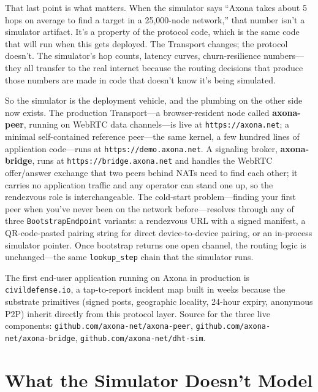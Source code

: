 \documentclass[nobib]{tufte-handout}
\begin{document}
That last point is what matters. When the simulator says ``Axona takes about 5 hops on average to find a target in a 25{,}000-node network,'' that number isn't a simulator artifact. It's a property of the protocol code, which is the same code that will run when this gets deployed. The Transport changes; the protocol doesn't. The simulator's hop counts, latency curves, churn-resilience numbers---they all transfer to the real internet because the routing decisions that produce those numbers are made in code that doesn't know it's being simulated.

So the simulator is the deployment vehicle, and the plumbing on the other side now exists. The production Transport---a browser-resident node called \textbf{axona-peer}, running on WebRTC data channels---is live at \texttt{https://axona.net}; a minimal self-contained reference peer---the same kernel, a few hundred lines of application code---runs at \texttt{https://demo.axona.net}. A signaling broker, \textbf{axona-bridge}, runs at \texttt{https://bridge.axona.net} and handles the WebRTC offer/answer exchange that two peers behind NATs need to find each other; it carries no application traffic and any operator can stand one up, so the rendezvous role is interchangeable. The cold-start problem---finding your first peer when you've never been on the network before---resolves through any of three \texttt{BootstrapEndpoint} variants: a rendezvous URL with a signed manifest, a QR-code-pasted pairing string for direct device-to-device pairing, or an in-process simulator pointer. Once bootstrap returns one open channel, the routing logic is unchanged---the same \texttt{lookup\_step} chain that the simulator runs.

The first end-user application running on Axona in production is \texttt{civildefense.io}, a tap-to-report incident map built in weeks because the substrate primitives (signed posts, geographic locality, 24-hour expiry, anonymous P2P) inherit directly from this protocol layer. Source for the three live components: \texttt{github.com/axona-net/axona-peer}, \texttt{github.com/axona-net/axona-bridge}, \texttt{github.com/axona-net/dht-sim}.

\section{What the Simulator Doesn't Model}
\end{document}

